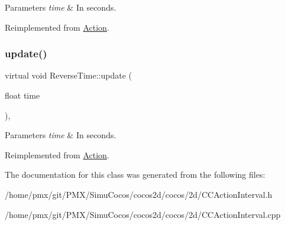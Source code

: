 \begin{DoxyParams}{Parameters}
{\em time} & In seconds. \\
\hline
\end{DoxyParams}


Reimplemented from \hyperlink{classAction_a937e646e63915e33ad05ba149bfcf239}{Action}.

\mbox{\label{classReverseTime_a362f5b46a1b2e1a9b2ce8a59df1dca97}} 
\subsubsection{\texorpdfstring{update()}{update()}\hspace{0.1cm}{\footnotesize\ttfamily [2/2]}}
{\footnotesize\ttfamily virtual void Reverse\+Time\+::update (\begin{DoxyParamCaption}\item[{float}]{time }\end{DoxyParamCaption})\hspace{0.3cm}{\ttfamily [override]}, {\ttfamily [virtual]}}


\begin{DoxyParams}{Parameters}
{\em time} & In seconds. \\
\hline
\end{DoxyParams}


Reimplemented from \hyperlink{classAction_a937e646e63915e33ad05ba149bfcf239}{Action}.



The documentation for this class was generated from the following files\+:\begin{DoxyCompactItemize}
\item 
/home/pmx/git/\+P\+M\+X/\+Simu\+Cocos/cocos2d/cocos/2d/C\+C\+Action\+Interval.\+h\item 
/home/pmx/git/\+P\+M\+X/\+Simu\+Cocos/cocos2d/cocos/2d/C\+C\+Action\+Interval.\+cpp\end{DoxyCompactItemize}
